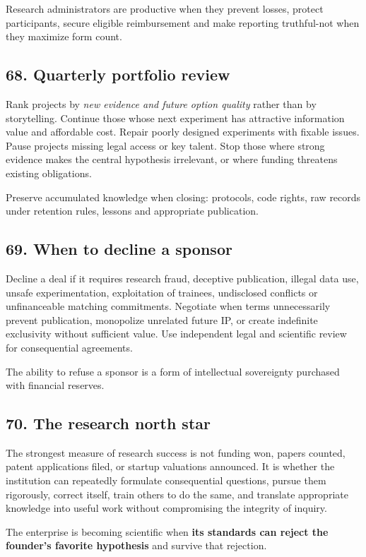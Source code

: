 Research administrators are productive when they prevent losses, protect participants, secure eligible reimbursement and make reporting truthful-not when they maximize form count.

\subsection{68. Quarterly portfolio review}

Rank projects by \textit{new evidence and future option quality} rather than by storytelling. Continue those whose next experiment has attractive information value and affordable cost. Repair poorly designed experiments with fixable issues. Pause projects missing legal access or key talent. Stop those where strong evidence makes the central hypothesis irrelevant, or where funding threatens existing obligations.

Preserve accumulated knowledge when closing: protocols, code rights, raw records under retention rules, lessons and appropriate publication.

\subsection{69. When to decline a sponsor}

Decline a deal if it requires research fraud, deceptive publication, illegal data use, unsafe experimentation, exploitation of trainees, undisclosed conflicts or unfinanceable matching commitments. Negotiate when terms unnecessarily prevent publication, monopolize unrelated future IP, or create indefinite exclusivity without sufficient value. Use independent legal and scientific review for consequential agreements.

The ability to refuse a sponsor is a form of intellectual sovereignty purchased with financial reserves.

\subsection{70. The research north star}

The strongest measure of research success is not funding won, papers counted, patent applications filed, or startup valuations announced. It is whether the institution can repeatedly formulate consequential questions, pursue them rigorously, correct itself, train others to do the same, and translate appropriate knowledge into useful work without compromising the integrity of inquiry.

The enterprise is becoming scientific when \textbf{its standards can reject the founder's favorite hypothesis} and survive that rejection.
